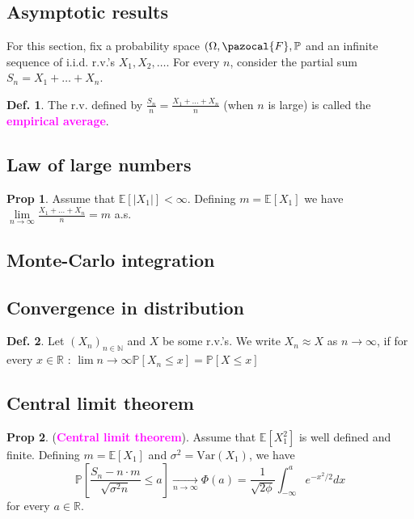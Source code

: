\documentclass[8pt,a4paper,landscape]{article}
\theoremstyle{definition}
\newtheorem{definition}{Def.}[section]
\theoremstyle{example}
\theoremstyle{intuition}
\theoremstyle{definition}
\newtheorem{proposition}{Prop}[section]
\newcommand{\Fb}{\pazocal{F}}
\newcommand{\mydef}[1]{\textcolor{magenta}{\textbf{#1}}}
\newcommand{\prob}[1]{\mathbb{P}\left[ #1 \right]}
\newcommand{\expec}[1]{\mathbb{E}\left[ #1 \right]}
\begin{document}
\begin{multicols}{3}
	\section{Asymptotic results}
		For this section, fix a probability space $(\Omega, \Fb, \mathbb{P}$ and an infinite sequence of i.i.d. r.v.'s $X_1, X_2, \ldots$. For every $n$, consider the partial sum $S_n = X_1 + \ldots + X_n$.
		\begin{definition}
			The r.v. defined by $\frac{S_n}{n} = \frac{X_1 + \ldots + X_n}{n}$ (when $n$ is large) is called the \mydef{empirical average}.
		\end{definition}


		\subsection{Law of large numbers}
			\begin{proposition}
				Assume that $\expec{\lvert X_1 \lvert} < \infty$. Defining $m = \expec{X_1}$ we have 
				$
					\lim\limits_{n \to \infty} \frac{X_1 + \ldots + X_n}{n} = m
				$ a.s.
			\end{proposition}


		\subsection{Monte-Carlo integration}


		\subsection{Convergence in distribution}
			\begin{definition}
				Let $(X_n)_{n \in \mathbb{N}}$ and $X$ be some r.v.'s. We write $X_n \approx X$ as $n \to \infty$, if for every $x \in \mathbb{R}$ : $\lim\limits{n \to \infty} \prob{X_n \leq x} = \prob{X \leq x}$
			\end{definition}

		
		\subsection{Central limit theorem}
			\begin{proposition}
				(\mydef{Central limit theorem}).
			Assume that $\expec{X_1^2}$ is well defined and finite. Defining $m = \expec{X_1}$ and $\sigma^2 = \text{Var}(X_1)$, we have 
				$$
				\prob{\frac{S_n - n\cdot m}{\sqrt{\sigma^2 n}} \leq a} \underset{n \to \infty}{\longrightarrow} \Phi(a) = \frac{1}{\sqrt{2\phi}} \int_{-\infty}^a e^{-x^2 / 2} dx
				$$
				for every $a \in \mathbb{R}$.
			\end{proposition}





\end{multicols}
\end{document}
